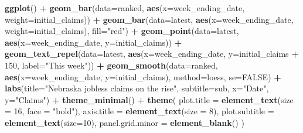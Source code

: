 \documentclass[]{book}
\newenvironment{Shaded}{\begin{snugshade}}{\end{snugshade}}
\newcommand{\DataTypeTok}[1]{\textcolor[rgb]{0.13,0.29,0.53}{#1}}
\newcommand{\DecValTok}[1]{\textcolor[rgb]{0.00,0.00,0.81}{#1}}
\newcommand{\KeywordTok}[1]{\textcolor[rgb]{0.13,0.29,0.53}{\textbf{#1}}}
\newcommand{\NormalTok}[1]{#1}
\newcommand{\OperatorTok}[1]{\textcolor[rgb]{0.81,0.36,0.00}{\textbf{#1}}}
\newcommand{\OtherTok}[1]{\textcolor[rgb]{0.56,0.35,0.01}{#1}}
\newcommand{\StringTok}[1]{\textcolor[rgb]{0.31,0.60,0.02}{#1}}
\begin{document}
\begin{Shaded}
\begin{Highlighting}[]
\KeywordTok{ggplot}\NormalTok{() }\OperatorTok{+}\StringTok{ }
\StringTok{  }\KeywordTok{geom_bar}\NormalTok{(}\DataTypeTok{data=}\NormalTok{ranked, }\KeywordTok{aes}\NormalTok{(}\DataTypeTok{x=}\NormalTok{week_ending_date, }\DataTypeTok{weight=}\NormalTok{initial_claims)) }\OperatorTok{+}
\StringTok{  }\KeywordTok{geom_bar}\NormalTok{(}\DataTypeTok{data=}\NormalTok{latest, }\KeywordTok{aes}\NormalTok{(}\DataTypeTok{x=}\NormalTok{week_ending_date, }\DataTypeTok{weight=}\NormalTok{initial_claims), }\DataTypeTok{fill=}\StringTok{"red"}\NormalTok{) }\OperatorTok{+}
\StringTok{  }\KeywordTok{geom_point}\NormalTok{(}\DataTypeTok{data=}\NormalTok{latest, }\KeywordTok{aes}\NormalTok{(}\DataTypeTok{x=}\NormalTok{week_ending_date, }\DataTypeTok{y=}\NormalTok{initial_claims)) }\OperatorTok{+}\StringTok{ }
\StringTok{  }\KeywordTok{geom_text_repel}\NormalTok{(}\DataTypeTok{data=}\NormalTok{latest, }\KeywordTok{aes}\NormalTok{(}\DataTypeTok{x=}\NormalTok{week_ending_date, }\DataTypeTok{y=}\NormalTok{initial_claims }\OperatorTok{+}\StringTok{ }\DecValTok{150}\NormalTok{, }\DataTypeTok{label=}\StringTok{"This week"}\NormalTok{)) }\OperatorTok{+}\StringTok{ }
\StringTok{  }\KeywordTok{geom_smooth}\NormalTok{(}\DataTypeTok{data=}\NormalTok{ranked, }\KeywordTok{aes}\NormalTok{(}\DataTypeTok{x=}\NormalTok{week_ending_date, }\DataTypeTok{y=}\NormalTok{initial_claims), }\DataTypeTok{method=}\NormalTok{loess, }\DataTypeTok{se=}\OtherTok{FALSE}\NormalTok{) }\OperatorTok{+}\StringTok{ }
\StringTok{  }\KeywordTok{labs}\NormalTok{(}\DataTypeTok{title=}\StringTok{"Nebraska jobless claims on the rise"}\NormalTok{, }\DataTypeTok{subtitle=}\NormalTok{sub, }\DataTypeTok{x=}\StringTok{"Date"}\NormalTok{, }\DataTypeTok{y=}\StringTok{"Claims"}\NormalTok{) }\OperatorTok{+}
\StringTok{  }\KeywordTok{theme_minimal}\NormalTok{() }\OperatorTok{+}\StringTok{ }
\StringTok{  }\KeywordTok{theme}\NormalTok{(}
    \DataTypeTok{plot.title =} \KeywordTok{element_text}\NormalTok{(}\DataTypeTok{size =} \DecValTok{16}\NormalTok{, }\DataTypeTok{face =} \StringTok{"bold"}\NormalTok{),}
    \DataTypeTok{axis.title =} \KeywordTok{element_text}\NormalTok{(}\DataTypeTok{size =} \DecValTok{8}\NormalTok{), }
    \DataTypeTok{plot.subtitle =} \KeywordTok{element_text}\NormalTok{(}\DataTypeTok{size=}\DecValTok{10}\NormalTok{), }
    \DataTypeTok{panel.grid.minor =} \KeywordTok{element_blank}\NormalTok{()}
\NormalTok{    )}
\end{Highlighting}
\end{Shaded}
\end{document}
